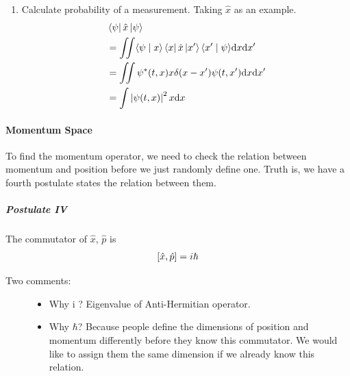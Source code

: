 \documentclass[letterpaper,10pt,english]{sphinxmanual}
\def\d{{\rm d}}
\newcommand{\bra}[1]{\left\langle #1\right|}
\newcommand{\ket}[1]{\left| #1\right\rangle}
\newcommand{\braket}[2]{\langle #1 \mid #2 \rangle}
\begin{document}
\begin{enumerate}
\item {} 
Calculate probability of a measurement. Taking \(\hat x\) as an example.
\begin{gather}
\begin{split}&\bra{\psi} \hat x \ket{\psi} \\
&= \iint \braket{\psi}{x}\bra{x} \hat x \ket{x'} \braket{x'}{\psi}  \d x \d x' \\
&= \iint  \psi^ * (t,x) x\delta(x-x') \psi(t,x')  \d x \d x'  \\
&= \int \left| \psi(t,x) \right|^2 x \d x\end{split}\notag
\end{gather}
\end{enumerate}


\paragraph{Momentum Space}
\label{Quantum/QuantumMechanics:momentum-space}
To find the momentum operator, we need to check the relation between momentum and position before we just randomly define one. Truth is, we have a fourth postulate states the relation between them.


\subparagraph{Postulate IV}
\label{Quantum/QuantumMechanics:postulate-iv}
The commutator of \(\hat x\), \(\hat p\) is
\begin{gather}
\begin{split}\left[ \hat x, \hat p \right] = i \hbar\end{split}\notag
\end{gather}\begin{description}
\item[{Two comments:}] \leavevmode\begin{itemize}
\item {} 
Why i ? Eigenvalue of Anti-Hermitian operator.

\item {} 
Why \(\hbar\)? Because people define the dimensions of position and momentum differently before they know this commutator. We would like to assign them the same dimension if we already know this relation.

\end{itemize}

\end{description}
\end{document}
